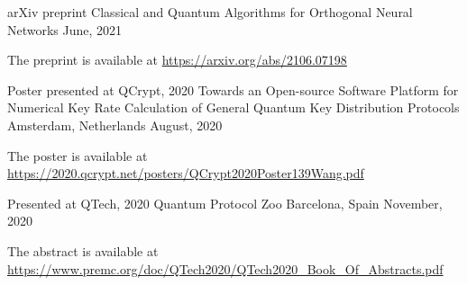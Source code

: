 

\begin{cventries}
  \cventry
    {arXiv preprint} %
    {Classical and Quantum Algorithms for Orthogonal Neural Networks} %
    {} %
    {June, 2021} %
    {
      \begin{cvitems} %
        \item {The preprint is available at \href{https://arxiv.org/abs/2106.07198}{https://arxiv.org/abs/2106.07198}}
      \end{cvitems}
    }

  \cventry
    {Poster presented at QCrypt, 2020} %
    {Towards an Open-source Software Platform for Numerical Key Rate Calculation of General Quantum Key Distribution Protocols} %
    {Amsterdam, Netherlands} %
    {August, 2020} %
    {
      \begin{cvitems} %
        \item {The poster is available at \href{https://2020.qcrypt.net/posters/QCrypt2020Poster139Wang.pdf}{https://2020.qcrypt.net/posters/QCrypt2020Poster139Wang.pdf}}
      \end{cvitems}
    }

  \cventry
    {Presented at QTech, 2020} %
    {Quantum Protocol Zoo} %
    {Barcelona, Spain} %
    {November, 2020} %
    {
      \begin{cvitems} %
        \item {The abstract is available at \href{https://www.premc.org/doc/QTech2020/QTech2020_Book_Of_Abstracts.pdf}{https://www.premc.org/doc/QTech2020/QTech2020\_Book\_Of\_Abstracts.pdf}}
      \end{cvitems}
    }

\end{cventries}
